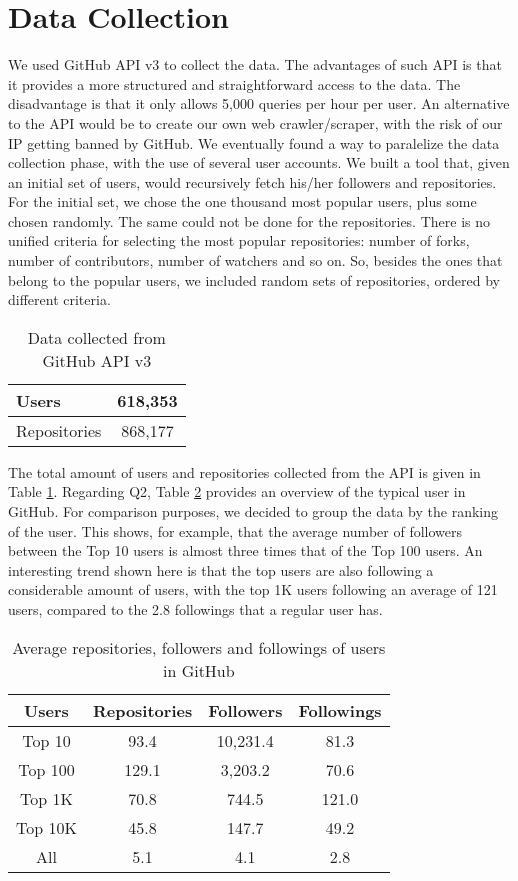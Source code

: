 
\section{Data Collection}
\label{sec:collection}

We used GitHub API v3 \cite{GitHubAPI} to collect the data. The advantages of such API is that it provides a more structured and straightforward access to the data. The disadvantage is that it only allows 5,000 queries per hour per user. An alternative to the API would be to create our own web crawler/scraper, with the risk of our IP getting banned by GitHub. We eventually found a way to paralelize the data collection phase, with the use of several user accounts. We built a tool that, given an initial set of users, would recursively fetch his/her followers and repositories. For the initial set, we chose the one thousand most popular users, plus some chosen randomly. The same could not be done for the repositories. There is no unified criteria for selecting the most popular repositories: number of forks, number of contributors, number of watchers and so on. So, besides the ones that belong to the popular users, we included random sets of repositories, ordered by different criteria.
\begin{table}
\centering
\begin{tabular}{ | l | c | }
	\hline
	Users & 618,353 \\ \hline
	Repositories & 868,177 \\ \hline
\end{tabular}
\caption{Data collected from GitHub API v3}
\label{tbl:datacollected}
\end{table}

The total amount of users and repositories collected from the API is given in Table \ref{tbl:datacollected}. Regarding Q2, Table \ref{tbl:topusers} provides an overview of the typical user in GitHub. For comparison purposes, we decided to group the data by the ranking of the user. This shows, for example, that the average number of followers between the Top 10 users is almost three times that of the Top 100 users. An interesting trend shown here is that the top users are also following a considerable amount of users, with the top 1K users following an average of 121 users, compared to the 2.8 followings that a regular user has.
\begin{table}
\centering
\begin{tabular}{ | c | c | c | c | }
	\hline
	Users & Repositories & Followers & Followings \\ \hline
	Top 10 & 93.4 & 10,231.4 & 81.3 \\ \hline
	Top 100 & 129.1 & 3,203.2 & 70.6 \\ \hline
	Top 1K & 70.8 & 744.5 & 121.0 \\ \hline
	Top 10K & 45.8 & 147.7 & 49.2 \\ \hline
	All & 5.1 & 4.1 & 2.8 \\ \hline
\end{tabular}
\caption{Average repositories, followers and followings of users in GitHub}
\label{tbl:topusers}
\end{table}

